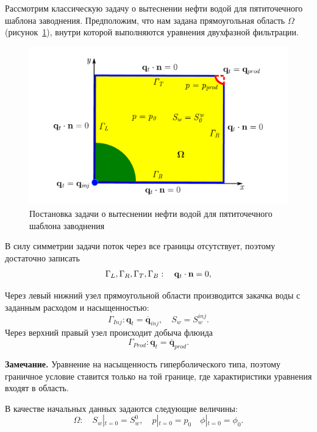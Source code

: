 Рассмотрим классическую задачу о вытеснении нефти водой для пятиточечного
шаблона заводнения. 
Предположим, что нам задана прямоугольная область $\Omega$ (рисунок~\ref{fig:ProblemInitBoundary}), 
внутри которой выполняются уравнения двухфазной фильтрации. 
\begin{figure}[H]
	\centering
	\includegraphics[width=1\linewidth]{img/Picture.pdf}
	\caption{Постановка задачи о вытеснении нефти водой для пятиточечного шаблона заводнения}
	\label{fig:ProblemInitBoundary}
\end{figure}

В силу симметрии задачи поток через все границы отсутствует, поэтому достаточно записать
\begin{equation}
	\Gamma_L, \Gamma_R, \Gamma_T, \Gamma_B: \quad \mathbf{q}_t \cdot \mathbf{n} = 0,
\end{equation}

Через левый нижний узел прямоугольной области производится закачка воды с заданным 
расходом и насыщенностью:
\begin{equation}\label{eq:GammaL}
	\Gamma_{Inj}: \bm{q}_{t} = \overline{\bm{q}}_{inj}, \quad S_w = S_w^{inj}.
\end{equation}
Через верхний правый узел происходит добыча флюида
\begin{equation}\label{eq:GammaR}
	\Gamma_{Prod}: \bm{q}_{t} = \overline{\bm{q}}_{prod}.
\end{equation}


\textbf{Замечание.} Уравнение на насыщенность гиперболического типа, поэтому граничное 
условие ставится только на той границе, где характиристики уравнения входят в область.

В качестве начальных данных задаются следующие величины:
\begin{equation}\label{eq:init_cond}
	\Omega: \quad S_w\left|_{t=0} = S_w^0\right., \quad p\left|_{t=0} = p_0\right.  \quad \phi\left|_{t=0} = \phi_0\right..
\end{equation}



